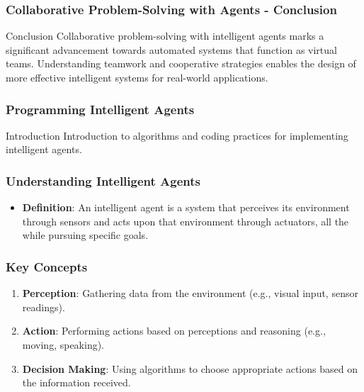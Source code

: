\documentclass[aspectratio=169]{beamer}
\begin{document}
\begin{frame}[fragile]
    \frametitle{Collaborative Problem-Solving with Agents - Conclusion}
    \begin{block}{Conclusion}
        Collaborative problem-solving with intelligent agents marks a significant advancement towards automated systems that function as virtual teams.  
        Understanding teamwork and cooperative strategies enables the design of more effective intelligent systems for real-world applications.
    \end{block}
\end{frame}

\begin{frame}
    \frametitle{Programming Intelligent Agents}
    \begin{block}{Introduction}
        Introduction to algorithms and coding practices for implementing intelligent agents.
    \end{block}
\end{frame}

\begin{frame}
    \frametitle{Understanding Intelligent Agents}
    \begin{itemize}
        \item \textbf{Definition}: An intelligent agent is a system that perceives its environment through sensors and acts upon that environment through actuators, all the while pursuing specific goals.
    \end{itemize}
\end{frame}

\begin{frame}
    \frametitle{Key Concepts}
    \begin{enumerate}
        \item \textbf{Perception}: Gathering data from the environment (e.g., visual input, sensor readings).
        \item \textbf{Action}: Performing actions based on perceptions and reasoning (e.g., moving, speaking).
        \item \textbf{Decision Making}: Using algorithms to choose appropriate actions based on the information received.
    \end{enumerate}
\end{frame}
\end{document}
